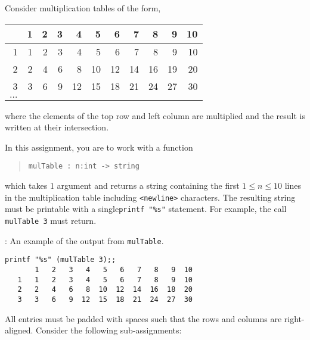 Consider multiplication tables of the form,
\begin{center}
  \begin{tabular}[c]{r|rrrrrrrrrr}
    & 1& 2& 3& 4& 5& 6& 7& 8& 9& 10\\\hline
   1 & 1& 2& 3& 4& 5& 6& 7& 8& 9& 10\\
   2 & 2& 4& 6& 8& 10& 12& 14& 16& 19& 20\\
   3 & 3& 6& 9& 12& 15& 18& 21& 24& 27& 30\\
    $\hdots$&&&&&&&&&&  
  \end{tabular}
\end{center}
where the elements of the top row and left column are multiplied and
the result is written at their intersection.

In this assignment, you are to work with a function
\begin{quote}
  \mbox{\lstinline!mulTable : n:int -> string!}
\end{quote}
which takes 1 argument and returns a string containing the first
$1\leq n\leq 10$ lines in the multiplication table including
\lstinline{<newline>} characters. The resulting string must be
printable with a single\lstinline!printf "%s"!%
statement. For example, the call \mbox{\lstinline!mulTable 3!} must
return.
  \begin{codeNOutput}[label=mulTab]{: An example of the output from \lstinline!mulTable!.}
\begin{lstlisting}
printf "%s" (mulTable 3);;
       1   2   3   4   5   6   7   8   9  10
   1   1   2   3   4   5   6   7   8   9  10
   2   2   4   6   8  10  12  14  16  18  20
   3   3   6   9  12  15  18  21  24  27  30
\end{lstlisting}
\end{codeNOutput}
All entries must be padded with spaces such that the rows and columns
are right-aligned. Consider the following sub-assignments:
